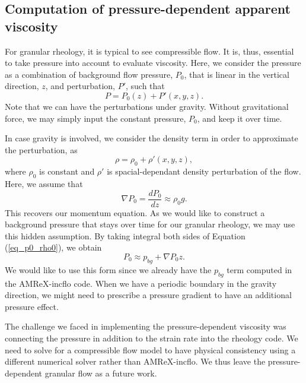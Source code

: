 \subsection{Computation of pressure-dependent apparent viscosity}
For granular rheology, it is typical to see compressible flow. It is, thus, essential to take pressure into account to evaluate viscosity.
Here, we consider the pressure as a combination of background flow pressure, $P_0$, that is linear in the vertical direction, $z$, and perturbation, $P'$, such that
\[
P = P_0(z) + P'(x,y,z).\]
Note that we can have the perturbations under gravity. Without gravitational force, we may simply input the constant pressure, $P_0$, and keep it over time.
\par
In case gravity is involved, we consider the density term in order to approximate the perturbation, as 
\[
\rho  = \rho_0  + \rho'(x,y,z), 
\]
where $\rho_0$ is constant and $\rho'$ is spacial-dependant density perturbation of the flow. 
Here, we assume that 
\begin{equation}
    \nabla P_0  = \frac{d P_0}{d z} \approx \rho_0  g.  
\label{eq_p0_rho0}
\end{equation}
This recovers our momentum equation. As we would like to construct a background pressure that stays over time for our granular rheology, we may use this hidden assumption.
By taking integral both sides of Equation (\ref{eq_p0_rho0}), we obtain
\begin{equation}
    P_0 \approx p_{bg} + \nabla P_0 z.
\end{equation}
We would like to use this form since we already have the $p_{bg}$ term computed in the AMReX-incflo code.
%
When we have a periodic boundary in the gravity direction, we might need to prescribe a pressure gradient to have an additional pressure effect. 
\par
The challenge we faced in implementing the pressure-dependent viscosity was connecting the pressure in addition to the strain rate into the rheology code. We need to solve for a compressible flow model to have physical consistency using a different numerical solver rather than AMReX-incflo. We thus leave the pressure-dependent granular flow as a future work.

